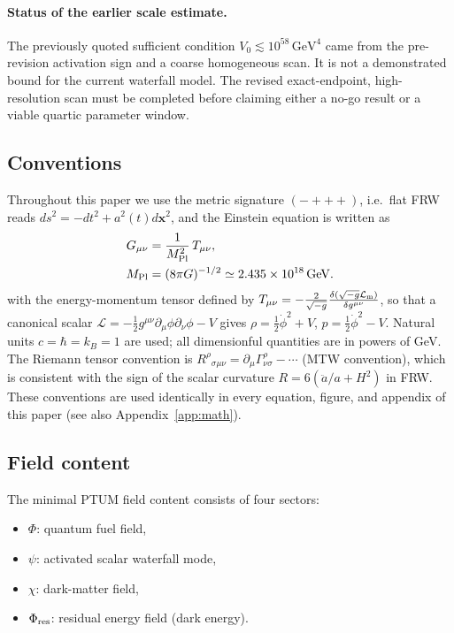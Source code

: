 \documentclass[epj]{svjour}
\begin{document}
\paragraph{Status of the earlier scale estimate.}
The previously quoted sufficient condition
$V_0\lesssim10^{58}\,\mathrm{GeV}^4$ came from the pre-revision
activation sign and a coarse homogeneous scan. It is not a
demonstrated bound for the current waterfall model. The revised
exact-endpoint, high-resolution scan must be completed before
claiming either a no-go result or a viable quartic parameter window.

\subsection{Conventions}
\label{sec:conventions}

Throughout this paper we use the metric signature \((-+++)\), i.e.\
flat FRW reads \(ds^2=-dt^2+a^2(t)d\mathbf{x}^2\), and the Einstein
equation is written as
\begin{equation}
\begin{aligned}
G_{\mu\nu} &= \frac{1}{M_{\rm Pl}^2}\,T_{\mu\nu},\\
M_{\rm Pl} &= (8\pi G)^{-1/2}
\simeq 2.435\times10^{18}\,\mathrm{GeV}.
\end{aligned}
\end{equation}
with the energy-momentum tensor defined by
\(T_{\mu\nu}=-\frac{2}{\sqrt{-g}}\frac{\delta(\sqrt{-g}\mathcal{L}_{\rm m})}
{\delta g^{\mu\nu}}\), so that a canonical scalar
\(\mathcal{L}=-\tfrac12 g^{\mu\nu}\partial_\mu\phi\partial_\nu\phi-V\) gives
\(\rho=\tfrac12\dot\phi^2+V\), \(p=\tfrac12\dot\phi^2-V\).
Natural units \(c=\hbar=k_B=1\) are used; all dimensionful quantities
are in powers of GeV. The Riemann tensor convention is
\(R^{\rho}{}_{\sigma\mu\nu}=\partial_\mu\Gamma^{\rho}_{\nu\sigma}-\cdots\)
(MTW convention), which is consistent with the sign of the scalar
curvature \(R=6(\ddot a/a+H^2)\) in FRW. These conventions are used
identically in every equation, figure, and appendix of this paper
(see also Appendix~\ref{app:math}).

\subsection{Field content}

The minimal PTUM field content consists of four sectors:

\begin{itemize}
\item \(\Phi\): quantum fuel field,
\item \(\psi\): activated scalar waterfall mode,
\item \(\chi\): dark-matter field,
\item \(\Phi_{\rm res}\): residual energy field (dark energy).
\end{itemize}
\end{document}
